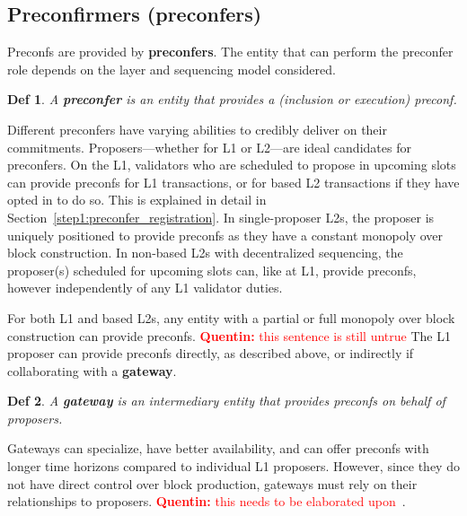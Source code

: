 \documentclass[a4paper]{article}
\theoremstyle{boldstyle}
\newtheorem*{definitionx}{Def}
\newenvironment{definition}
  {\begin{defopenboxq}\begin{definitionx}}
  {\end{definitionx}\end{defopenboxq}}
\newcommand{\cm}[1]{\textcolor{blue}{\textbf{Conor:} #1}}
\newcommand{\qb}[1]{\textcolor{red}{\textbf{Quentin:} #1}}
\newcommand{\todocm}[1]{\todo[color=blue!40]{\textbf{Conor:} #1}}
\begin{document}
        
    \subsection{Preconfirmers (preconfers)} \todocm{please refine definitions}
        Preconfs are provided by \textbf{preconfers}. The entity that can perform the preconfer role depends on the layer and sequencing model considered. 
        \begin{definition}
        A \textbf{preconfer} is an entity that provides a (inclusion or execution) preconf. 
        \end{definition}

        Different preconfers have varying abilities to credibly deliver on their commitments. Proposers—whether for L1 or L2—are ideal candidates for preconfers. 
        On the L1, validators who are scheduled to propose in upcoming slots can provide preconfs for L1 transactions, or for based L2 transactions if they have opted in to do so. This is explained in detail in Section~\ref{step1:preconfer_registration}. In single-proposer L2s, the proposer is uniquely positioned to provide preconfs as they have a constant monopoly over block construction. In non-based L2s with decentralized sequencing, the proposer(s) scheduled for upcoming slots can, like at L1, provide preconfs, however independently of any L1 validator duties. 

        For both L1 and based L2s, any entity with a partial or full monopoly over block construction can provide preconfs. \qb{this sentence is still untrue} The L1 proposer can provide preconfs directly, as described above, or indirectly if collaborating with a \textbf{gateway}. 
        \begin{definition}
        A \textbf{gateway} is an intermediary entity that provides preconfs on behalf of proposers. 
        \end{definition}
        Gateways can specialize, have better availability, and can offer preconfs with longer time horizons compared to individual L1 proposers. However, since they do not have direct control over block production, gateways must rely on their relationships to proposers. \qb{this needs to be elaborated upon}~\cite{W:ThePreconfirmationGatewayUnlockingPreconfirmations:FromUsertoPreconfer, W:Ahead-of-TimeBlockAuctionsToEnableExecutionPreconfirmations,W:DelegationinBolt:OutsourcingSophisticationWhilePreservingDecentralization}.
\end{document}
